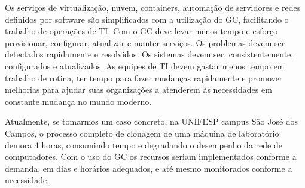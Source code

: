 \documentclass[quali]{mpit}
\begin{document}
Os serviços de virtualização, nuvem, containers, automação de servidores e  redes definidos por software são simplificados com a utilização do GC, facilitando o trabalho de operações de TI. Com o GC deve levar menos tempo e esforço  provisionar, configurar, atualizar e manter serviços. Os problemas devem ser detectados rapidamente e resolvidos. Os sistemas devem ser, consistentemente, configurados e atualizados. As equipes de TI devem gastar menos tempo em trabalho de rotina, ter tempo para fazer mudanças rapidamente e promover melhorias para ajudar suas organizações a atenderem às necessidades em constante mudança no mundo moderno.

Atualmente, se tomarmos um caso concreto, na UNIFESP campus São José dos Campos, o processo completo de clonagem de uma máquina de laboratório demora 4 horas, consumindo tempo e degradando o desempenho da rede de computadores. Com o uso do GC os recursos seriam implementados conforme a demanda, em dias e horários adequados, e até mesmo monitorados conforme a necessidade. 
\end{document}
